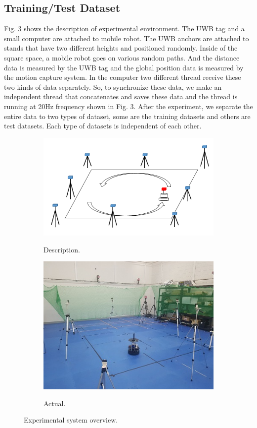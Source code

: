 \documentclass[letterpaper, 10 pt, conference]{ieeeconf}  %
\begin{document}
\subsection{Training/Test Dataset}

Fig. \ref{setting} shows the description of experimental environment. The UWB tag and a small computer are attached to mobile robot. The UWB anchors are attached to stands that have two different heights and positioned randomly. Inside of the square space, a mobile robot goes on various random paths. And the distance data is measured by the UWB tag and the global position data is measured by the motion capture system. In the computer two different thread receive these two kinds of data separately. So, to synchronize these data, we make an independent thread that concatenates and saves these data and the thread is running at 20Hz frequency shown in Fig. 3. After the experiment, we separate the entire data to two types of dataset, some are the training datasets and others are test datasets. Each type of datasets is independent of each other.
\begin{figure}[h]
	\centering
	\begin{subfigure}[b]{.25\textwidth}
		\centering
		\includegraphics[width=.9\textwidth]{descriptionSystem}
		\label{setting:sub1} 	
		\caption{Description.}
	\end{subfigure}%
	\begin{subfigure}[b]{.25\textwidth}
		\centering
		\includegraphics[width=.9\textwidth]{actualSystem}
		\label{setting:sub2} 	
		\caption{Actual.}
	\end{subfigure}
	\caption{Experimental system overview.}
	\label{setting}
	
\end{figure}
\end{document}
